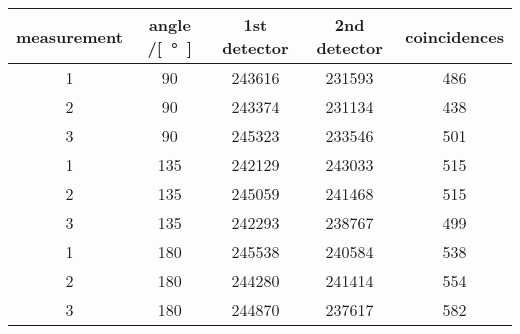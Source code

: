 \begin{tabular}{ccccc}
\toprule
measurement&angle /\si[\degree]&1st detector&2nd detector&coincidences\\
\midrule
1&90&243616&231593&486\\
2&90&243374&231134&438\\
3&90&245323&233546&501\\
1&135&242129&243033&515\\
2&135&245059&241468&515\\
3&135&242293&238767&499\\
1&180&245538&240584&538\\
2&180&244280&241414&554\\
3&180&244870&237617&582\\
\bottomrule
\end{tabular}